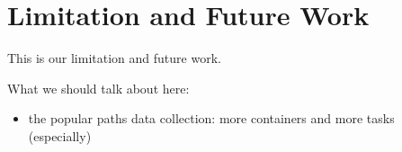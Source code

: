 \section{Limitation and Future Work}
\label{sec.limitation}
This is our limitation and future work. 

What we should talk about here: 

\begin{itemize}
\item the popular paths data collection: more containers and more tasks (especially)
\end{itemize}